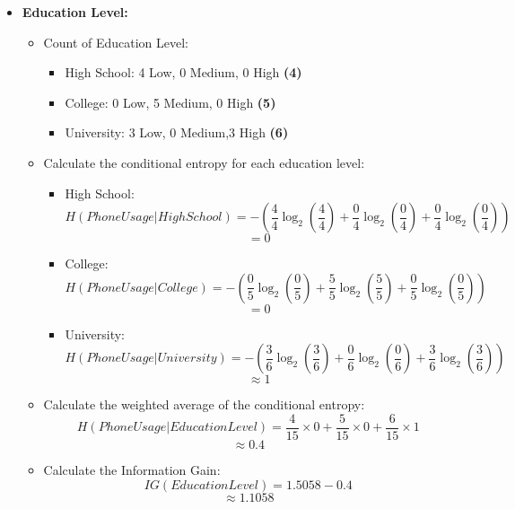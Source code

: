 \documentclass{article}
\begin{document}
\begin{enumerate}[label=\alph*)]
\begin{itemize}
\item \textbf{Education Level:}
\begin{itemize}
   \item Count of Education Level:
   \begin{itemize}
      \item High School: 4 Low, 0 Medium, 0 High \textbf{(4)}
      \item College: 0 Low, 5 Medium, 0 High \textbf{(5)}
      \item University: 3 Low, 0 Medium,3 High \textbf{(6)}
   \end{itemize}
   \item Calculate the conditional entropy for each education level:
   \begin{itemize}
      \item High School:
      \[
      H(Phone Usage | High School) = -(\frac{4}{4} \log_2(\frac{4}{4}) + \frac{0}{4} \log_2(\frac{0}{4}) + \frac{0}{4} \log_2(\frac{0}{4}))
      \]
      \[
      = 0
      \]
      \item College:
      \[
      H(Phone Usage | College) = -(\frac{0}{5} \log_2(\frac{0}{5}) + \frac{5}{5} \log_2(\frac{5}{5}) + \frac{0}{5} \log_2(\frac{0}{5}))
      \]
      \[
      = 0
      \]
      \item University:
      \[
      H(Phone Usage | University) = -(\frac{3}{6} \log_2(\frac{3}{6}) + \frac{0}{6} \log_2(\frac{0}{6}) + \frac{3}{6} \log_2(\frac{3}{6}))
      \]
      \[
      \approx 1
      \]
   \end{itemize}
   \item Calculate the weighted average of the conditional entropy:
   \[
   H(Phone Usage | Education Level) = \frac{4}{15} \times 0 + \frac{5}{15} \times 0 + \frac{6}{15} \times 1
   \]
   \[
   \approx 0.4
   \]
   \item Calculate the Information Gain:
   \[
   IG(Education Level) = 1.5058 - 0.4
   \]
   \[
   \approx 1.1058
   \]


\end{itemize}
\end{itemize}
\end{enumerate}
\end{document}
